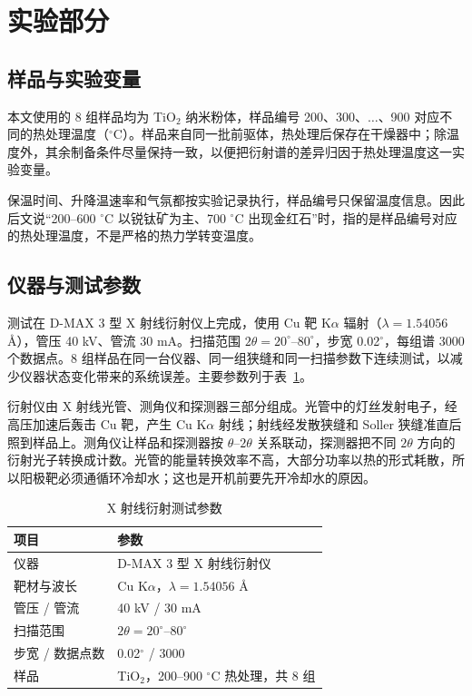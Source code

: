 \section{实验部分}

\subsection{样品与实验变量}

本文使用的 8 组样品均为 TiO$_2$ 纳米粉体，样品编号 200、300、$\ldots$、900 对应不同的热处理温度（$^\circ$C）。样品来自同一批前驱体，热处理后保存在干燥器中；除温度外，其余制备条件尽量保持一致，以便把衍射谱的差异归因于热处理温度这一实验变量。

保温时间、升降温速率和气氛都按实验记录执行，样品编号只保留温度信息。因此后文说“200--600 $^\circ$C 以锐钛矿为主、700 $^\circ$C 出现金红石”时，指的是样品编号对应的热处理温度，不是严格的热力学转变温度。

\subsection{仪器与测试参数}

测试在 D-MAX 3 型 X 射线衍射仪上完成，使用 Cu 靶 K$\alpha$ 辐射（$\lambda=1.54056$ \AA），管压 40 kV、管流 30 mA。扫描范围 $2\theta=20^\circ$--$80^\circ$，步宽 0.02$^\circ$，每组谱 3000 个数据点。8 组样品在同一台仪器、同一组狭缝和同一扫描参数下连续测试，以减少仪器状态变化带来的系统误差。主要参数列于表~\ref{tab:params}。

衍射仪由 X 射线光管、测角仪和探测器三部分组成。光管中的灯丝发射电子，经高压加速后轰击 Cu 靶，产生 Cu K$\alpha$ 射线；射线经发散狭缝和 Soller 狭缝准直后照到样品上。测角仪让样品和探测器按 $\theta$--$2\theta$ 关系联动，探测器把不同 $2\theta$ 方向的衍射光子转换成计数。光管的能量转换效率不高，大部分功率以热的形式耗散，所以阳极靶必须通循环冷却水；这也是开机前要先开冷却水的原因。

\begin{table}[H]
  \centering
  \caption{X 射线衍射测试参数}
  \label{tab:params}
  \begin{tabular}{@{}ll@{}}
    \toprule
    项目 & 参数 \\
    \midrule
    仪器 & D-MAX 3 型 X 射线衍射仪 \\
    靶材与波长 & Cu K$\alpha$，$\lambda=1.54056$ \AA \\
    管压 / 管流 & 40 kV / 30 mA \\
    扫描范围 & $2\theta=20^\circ$--$80^\circ$ \\
    步宽 / 数据点数 & 0.02$^\circ$ / 3000 \\
    样品 & TiO$_2$，200--900 $^\circ$C 热处理，共 8 组 \\
    \bottomrule
  \end{tabular}
\end{table}

